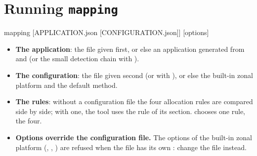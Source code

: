 \section{Running \texttt{mapping}}
\label{sec:running}

\begin{shell}
mapping [APPLICATION.json [CONFIGURATION.json]] [options]
\end{shell}

\begin{itemize}
\item \textbf{The application}: the file given first, or else an
application generated from  and  (or the small
detection chain with ).
\item \textbf{The configuration}: the file given second (or with
), or else the built-in zonal platform and the default method.
\item \textbf{The rules}: without a configuration file the four allocation
rules are compared side by side; with one, the tool uses the rule of its
 section.  chooses one rule,  the four.
\item \textbf{Options override the configuration file.} The options of the
built-in zonal platform (, , )
are refused when the file has its own : change the file
instead.
\end{itemize}

